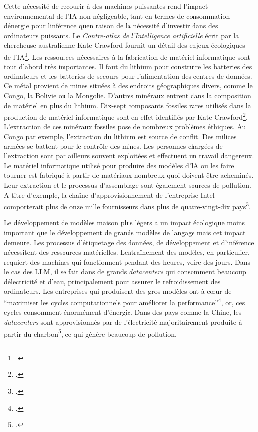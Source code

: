 	Cette nécessité
	de recourir à des machines puissantes rend l'impact environnemental de
	l'IA non négligeable, tant en termes de consommation
	d\textquotesingle énergie pour l\textquotesingle inférence
	qu\textquotesingle en raison de la nécessité d'investir dans des
	ordinateurs puissants. Le \emph{Contre-atlas de l'Intelligence artificielle} écrit par la chercheuse australienne Kate Crawford
	fournit un détail des enjeux écologiques de l'IA\footcite{crawford_contre-atlas_2023}.
	Les ressources nécessaires à la fabrication de matériel informatique sont
	tout d'abord très importantes. Il faut du lithium pour construire les batteries
	des ordinateurs et les batteries de secours pour l'alimentation des centres de données.
	Ce métal provient de mines situées à des endroits géographiques divers, comme le 
	Congo, la Bolivie ou la Mongolie.
	D'autres minéraux entrent dans la composition de matériel en plus du lithium.
	Dix-sept composants fossiles rares utilisés dans la production de matériel informatique
	sont en effet identifiés par Kate Crawford\footcite{crawford_contre-atlas_2023}.
	L'extraction de ces minéraux fossiles pose de nombreux problèmes éthiques.
	Au Congo par exemple, l'extraction du lithium est source de conflit.
	Des milices armées se battent pour le contrôle des mines. Les personnes chargées
	de l'extraction sont par ailleurs souvent exploitées et effectuent un travail dangereux.
	Le matériel informatique utilisé pour produire des modèles d'IA ou les faire tourner est fabriqué à partir de matériaux nombreux quoi doivent être acheminés. Leur extraction et le processus d'assemblage
	sont également sources de pollution.
	A titre d'exemple, la chaîne d'approvisionnement de l'entreprise Intel comporterait plus de onze mille fournisseurs
	dans plus de quatre-vingt-dix pays\footcite{noauthor_etude_2022}.

	
	Le développement de modèles maison plus légers a un impact écologique
	moins important que le développement de grands modèles de langage mais
	cet impact demeure. Les processus d'étiquetage des données, de
	développement et d'inférence nécessitent des ressources matérielles.
	L\textquotesingle entraînement des modèles, en particulier, requiert des
	machines qui fonctionnent pendant des heures, voire des jours. Dans le
	cas des \gls{LLM}, il se fait dans de grands \emph{datacenters} qui
	consomment beaucoup d\textquotesingle électricité et d'eau, principalement pour assurer le refroidissement des ordinateurs. 
	Les entreprises qui produisent des gros modèles ont à cœur de
	\enquote{maximiser les cycles computationnels pour améliorer la  performance}\footcite{crawford_contre-atlas_2023}, or, ces cycles consomment énormément d'énergie.
	Dans des pays comme la Chine, les \emph{datacenters} sont approvisionnés par de l'électricité majoritairement produite à partir du charbon\footcite{crawford_contre-atlas_2023}, ce qui génère beaucoup de pollution.
	
